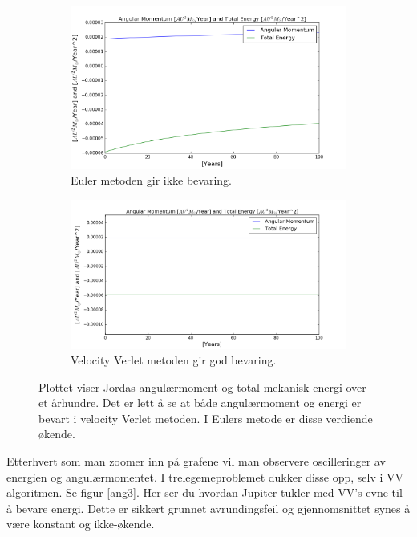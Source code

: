\documentclass[11pt,a4paper]{article}
\begin{document}
\FloatBarrier
\begin{figure}[!ht]
\centering
\begin{subfigure}{.50\textwidth}
  \centering
  \includegraphics[width=1.1\linewidth]{conserved_euler_J.png}
  \caption{Euler metoden gir ikke bevaring.}
  \label{ang1}
\end{subfigure}%
\begin{subfigure}{.55\textwidth}
  \centering
  \includegraphics[width=1.1\linewidth]{conserved.png}
  \caption{Velocity Verlet metoden gir god bevaring. }
  \label{ang2}
\end{subfigure}
\caption{Plottet viser Jordas angulærmoment og total mekanisk energi over et århundre. Det er lett å se at både angulærmoment og energi er bevart i velocity Verlet metoden. I Eulers metode er disse verdiende økende.}
\label{fig:duhhhhhh}
\end{figure}
\FloatBarrier
Etterhvert som man zoomer inn på grafene vil man observere oscilleringer av energien og angulærmomentet. I trelegemeproblemet dukker disse opp, selv i VV algoritmen.
Se figur \ref{ang3}. Her ser du hvordan Jupiter tukler med VV's evne til å bevare energi. Dette er sikkert grunnet avrundingsfeil og gjennomsnittet synes å være konstant og ikke-økende.\\
\end{document}
